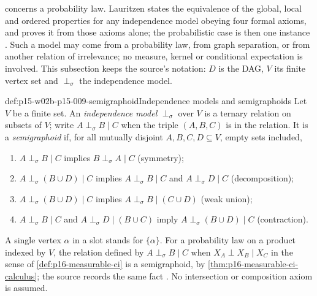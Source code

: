  concerns a probability law.
Lauritzen states the equivalence of the global, local and ordered
properties for any independence model obeying four formal axioms, and
proves it from those axioms alone; the probabilistic case is then one
instance \cite[Sec.~2.5.1, p.~52; Sec.~2.6.2, pp.~64--66;
Theorem~2.49, p.~67]{Lauritzen2019GraphicalLectures2020}.
Such a model may come from a probability law, from graph separation,
or from another relation of irrelevance; no measure, kernel or
conditional expectation is involved. This subsection keeps the source's
notation: \(D\) is the DAG, \(V\) its finite vertex set and
\(\perp_\sigma\) the independence model.

\begin{hbdefinition}{def:p15-w02b-p15-009-semigraphoid}{Independence models and semigraphoids}
Let \(V\) be a finite set. An \emph{independence model}
\(\perp_\sigma\) over \(V\) is a ternary relation on subsets of \(V\);
write \(A\perp_\sigma B\mid C\) when the triple \((A,B,C)\) is in the
relation. It is a \emph{semigraphoid} if, for all mutually disjoint
\(A,B,C,D\subseteq V\), empty sets included,
\begin{enumerate}
\item[(S1)] \(A\perp_\sigma B\mid C\) implies \(B\perp_\sigma A\mid C\)
  (symmetry);
\item[(S2)] \(A\perp_\sigma(B\cup D)\mid C\) implies
  \(A\perp_\sigma B\mid C\) and \(A\perp_\sigma D\mid C\)
  (decomposition);
\item[(S3)] \(A\perp_\sigma(B\cup D)\mid C\) implies
  \(A\perp_\sigma B\mid(C\cup D)\) (weak union);
\item[(S4)] \(A\perp_\sigma B\mid C\) and
  \(A\perp_\sigma D\mid(B\cup C)\) imply
  \(A\perp_\sigma(B\cup D)\mid C\) (contraction).
\end{enumerate}
A single vertex \(\alpha\) in a slot stands for \(\{\alpha\}\).
For a probability law on a product indexed by \(V\), the relation
defined by \(A\perp_\sigma B\mid C\) when \(X_A\perp X_B\mid X_C\) in
the sense of \cref{def:p16-measurable-ci} is a semigraphoid, by
\cref{thm:p16-measurable-ci-calculus}; the source records the same
fact \cite[Example~2.24, pp.~52--53]{Lauritzen2019GraphicalLectures2020}.
No intersection or composition axiom is assumed.
\end{hbdefinition}

